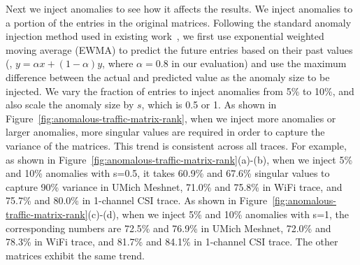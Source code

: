 Next we inject anomalies to see how it affects
the results.  We inject anomalies to a portion of the entries in the
original matrices. Following the standard anomaly injection method
used in existing work~\cite{PCA2, decentralized_PCA, P3CA}, 
we first use exponential weighted
moving average (EWMA) to predict the future entries based on their
past values (\ie, $y=\alpha x + (1-\alpha)y$, where $\alpha=0.8$ in
our evaluation) and use the maximum difference between the actual and
predicted value as the anomaly size to be injected. We vary the
fraction of entries to inject anomalies from 5\% to 10\%, and also
scale the anomaly size by $s$, which is 0.5 or 1. As shown in
Figure~\ref{fig:anomalous-traffic-matrix-rank}, 
when we inject more anomalies or larger anomalies, more singular values are
required in order to capture the variance of the matrices. This trend
is consistent across all traces. For example, as shown in
Figure~\ref{fig:anomalous-traffic-matrix-rank}(a)-(b), 
when we inject 5\% and 10\% anomalies with s=0.5, it takes 60.9\% and
67.6\% singular values to capture 90\% variance in UMich Meshnet, 
71.0\% and 75.8\% in WiFi trace, and 75.7\% and 80.0\% in 1-channel CSI trace.
As shown in
Figure~\ref{fig:anomalous-traffic-matrix-rank}(c)-(d), 
when we inject 5\% and 10\% anomalies with s=1, the corresponding numbers
are 72.5\% and 76.9\% in UMich Meshnet, 72.0\% and 78.3\% in WiFi trace,
and 81.7\% and 84.1\% in 1-channel CSI trace.
The other matrices exhibit the same trend.

